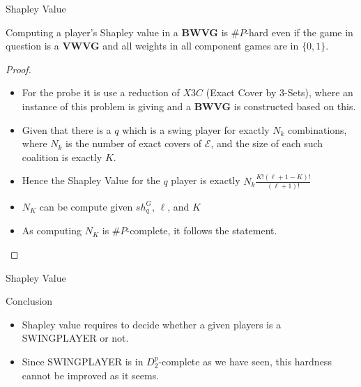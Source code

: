 \documentclass{beamer}
\begin{document}
\begin{frame}[fragile]{Shapley Value}
  \begin{theorem5}
    Computing a player's Shapley value in a \textbf{BWVG} is $\# P$-hard even if the game in question is a \textbf{VWVG}
    and all weights in all component games are in $\{0,1\}$.
  \end{theorem5}
  \begin{proof}
    \begin{itemize}
      \item For the probe it is use a reduction of $X3C$ (Exact Cover by 3-Sets), where an instance of this problem is giving and 
      a \textbf{BWVG} is constructed based on this.
      \item Given that there is a $q$ which is a swing player for exactly $N_k$ combinations, where $N_k$ is the number of exact covers of $\mathcal{E}$,
      and the size of each such coalition is exactly $K$.
      \item Hence the Shapley Value for the $q$ player is exactly $N_k \frac{K!(\ell + 1 - K)!}{(\ell + 1)!}$
      \item $N_K$ can be compute given $sh_q^G$, $\ell$, and $K$
      \item As computing $N_K$ is $\# P$-complete, it follows the statement.
    \end{itemize}
  \end{proof}
\end{frame}

\begin{frame}[fragile]{Shapley Value}
  \begin{block}{Conclusion}
    \begin{itemize}
      \item Shapley value requires to decide whether a given players is a SWINGPLAYER or not.
      \item Since SWINGPLAYER is in $D_2^p$-complete as we have seen, this hardness cannot be improved as it seems.
    \end{itemize}
  \end{block}
 \end{frame}
\end{document}
